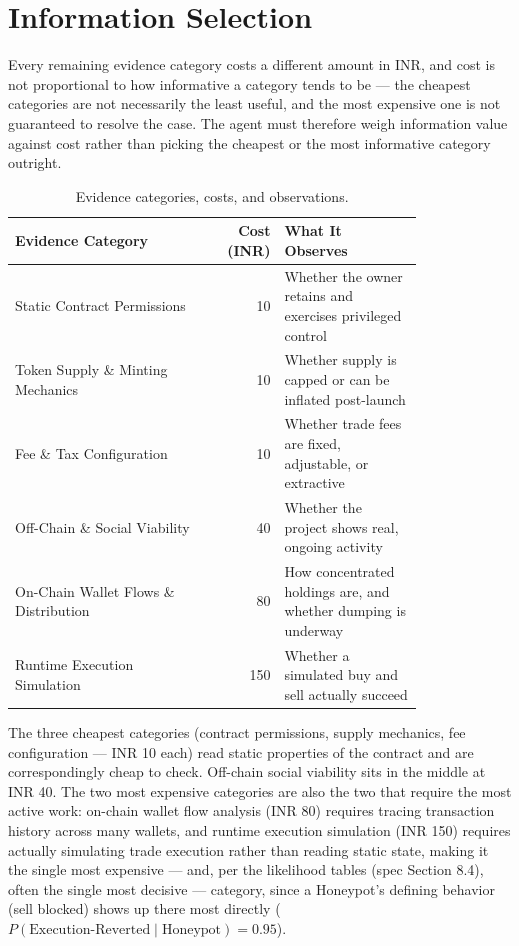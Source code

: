 \documentclass[11pt]{article}
\begin{document}
\section{Information Selection}

Every remaining evidence category costs a different amount in INR, and cost is not proportional to how informative a category tends to be --- the cheapest categories are not necessarily the least useful, and the most expensive one is not guaranteed to resolve the case. The agent must therefore weigh information value against cost rather than picking the cheapest or the most informative category outright.

\begin{table}[h]
\centering
\begin{tabular}{p{0.47\linewidth}rp{0.34\linewidth}}
\toprule
\textbf{Evidence Category} & \textbf{Cost (INR)} & \textbf{What It Observes}\\
\midrule
Static Contract Permissions & 10 & Whether the owner retains and exercises privileged control\\
Token Supply \& Minting Mechanics & 10 & Whether supply is capped or can be inflated post-launch\\
Fee \& Tax Configuration & 10 & Whether trade fees are fixed, adjustable, or extractive\\
Off-Chain \& Social Viability & 40 & Whether the project shows real, ongoing activity\\
On-Chain Wallet Flows \& Distribution & 80 & How concentrated holdings are, and whether dumping is underway\\
Runtime Execution Simulation & 150 & Whether a simulated buy and sell actually succeed\\
\bottomrule
\end{tabular}
\caption{Evidence categories, costs, and observations.}
\end{table}

The three cheapest categories (contract permissions, supply mechanics, fee configuration --- INR 10 each) read static properties of the contract and are correspondingly cheap to check. Off-chain social viability sits in the middle at INR 40. The two most expensive categories are also the two that require the most active work: on-chain wallet flow analysis (INR 80) requires tracing transaction history across many wallets, and runtime execution simulation (INR 150) requires actually simulating trade execution rather than reading static state, making it the single most expensive --- and, per the likelihood tables (spec Section 8.4), often the single most decisive --- category, since a Honeypot's defining behavior (sell blocked) shows up there most directly ($P(\text{Execution-Reverted}\mid\text{Honeypot})=0.95$).
\end{document}
